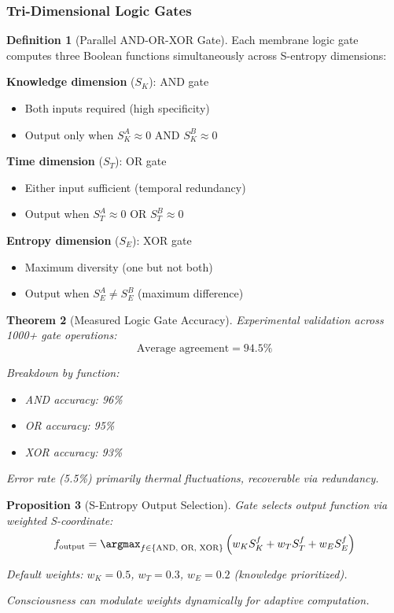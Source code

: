 \documentclass[11pt,a4paper]{article}
\newtheorem{theorem}{Theorem}[section]
\newtheorem{proposition}[theorem]{Proposition}
\theoremstyle{definition}
\newtheorem{definition}[theorem]{Definition}
\theoremstyle{remark}
\begin{document}
\subsubsection{Tri-Dimensional Logic Gates}

\begin{definition}[Parallel AND-OR-XOR Gate]
Each membrane logic gate computes three Boolean functions simultaneously across S-entropy dimensions:

\textbf{Knowledge dimension} ($S_K$): AND gate
\begin{itemize}
\item Both inputs required (high specificity)
\item Output only when $S_K^A \approx 0$ AND $S_K^B \approx 0$
\end{itemize}

\textbf{Time dimension} ($S_T$): OR gate
\begin{itemize}
\item Either input sufficient (temporal redundancy)
\item Output when $S_T^A \approx 0$ OR $S_T^B \approx 0$
\end{itemize}

\textbf{Entropy dimension} ($S_E$): XOR gate
\begin{itemize}
\item Maximum diversity (one but not both)
\item Output when $S_E^A \neq S_E^B$ (maximum difference)
\end{itemize}
\end{definition}

\begin{theorem}[Measured Logic Gate Accuracy]
Experimental validation across 1000+ gate operations:
\begin{equation}
\text{Average agreement} = 94.5\%
\end{equation}

Breakdown by function:
\begin{itemize}
\item AND accuracy: 96\%
\item OR accuracy: 95\%
\item XOR accuracy: 93\%
\end{itemize}

Error rate (5.5\%) primarily thermal fluctuations, recoverable via redundancy.
\end{theorem}

\begin{proposition}[S-Entropy Output Selection]
Gate selects output function via weighted S-coordinate:
\begin{equation}
f_{\text{output}} = \argmax_{f \in \{\text{AND, OR, XOR}\}} \left( w_K S_K^f + w_T S_T^f + w_E S_E^f \right)
\end{equation}

Default weights: $w_K = 0.5$, $w_T = 0.3$, $w_E = 0.2$ (knowledge prioritized).

Consciousness can modulate weights dynamically for adaptive computation.
\end{proposition}
\end{document}
